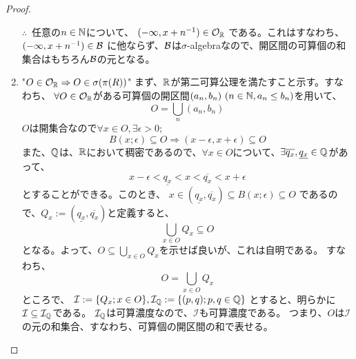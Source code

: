 \begin{proof}
\begin{enumerate}[font = \bfseries, label = step \arabic*.]
                    $\therefore$\ 任意の$n\in{\mathbb{N}}$について、
                    $(-\infty, x + n^{-1})\in\mathcal{O}_{{\mathbb{R}}}$
                    である。これはすなわち、
                    $(-\infty, x + n^{-1})\in{\mathcal{B}}$
                    に他ならず、${\mathcal{B}}$は$\sigma$-algebraなので、開区間の可算個の和集合はもちろん${\mathcal{B}}$の元となる。
    
                \item "$O\in\mathcal{O}_{{\mathbb{R}}} \Rightarrow O \in \sigma(\pi(R))$"
                    まず、${\mathbb{R}}$が第二可算公理を満たすこと示す。すなわち、
                    $\forall O \in \mathcal{O}_{{\mathbb{R}}}$がある可算個の開区間$(a_n, b_n)\ (n\in{\mathbb{N}}, a_n \leq b_n)$を用いて、
                    \[
                        O = \bigcup_{n} (a_n, b_n)
                    \]
                    $O$は開集合なので$\forall x \in O,\exists\epsilon > 0;$
                    \[
                        B(x;\epsilon) \subseteq O \Rightarrow (x-\epsilon, x + \epsilon)\subseteq O
                    \]
                    また、${\mathbb{Q}}$は、${\mathbb{R}}$において稠密であるので、$\forall x \in O$について、$\exists\overline{q_x}, \underline{q_x}\in {\mathbb{Q}}$があって、
                    \[
                        x - \epsilon < \underline{q_x} < x < \overline{q_x} < x + \epsilon
                    \]
                    とすることができる。このとき、
                    $x \in (\underline{q_x}, \overline{q_x}) \subseteq B(x;\epsilon) \subseteq O$
                    であるので、$Q_x := (\underline{q_x}, \overline{q_x})$と定義すると、
                    \[
                        \bigcup_{x\in O} Q_x \subseteq O
                    \]
                    となる。よって、$O \subseteq \bigcup_{x\in O} Q_x$を示せば良いが、これは自明である。
                    すなわち、
                    \[
                        O = \bigcup_{x\in O} Q_x
                    \]
                    ところで、
                    $\mathcal{I} := \{Q_x;x\in O\}, \mathcal{I}_{\mathbb{Q}} := \{(p,q); p,q\in{\mathbb{Q}}\}$
                    とすると、明らかに$\mathcal{I} \subseteq \mathcal{I}_{\mathbb{Q}}$である。
                    $\mathcal{I}_{\mathbb{Q}}$は可算濃度なので、$\mathcal{I}$も可算濃度である。
                    つまり、$O$は$\mathcal{I}$の元の和集合、すなわち、可算個の開区間の和で表せる。
                    

\end{enumerate}
\end{proof}
